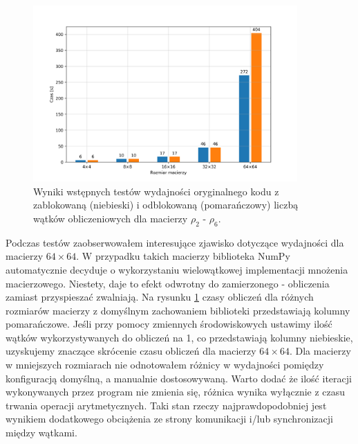 \documentclass[10pt, a4paper]{article}
\begin{document}
\begin{sloppypar}
    \FloatBarrier
    \begin{figure}[h]
      \centering
      \includegraphics[width=0.9\textwidth]{"resources/benchmark_1/plot.png"}
      \caption{Wyniki wstępnych testów wydajności oryginalnego kodu z zablokowaną (niebieski) i odblokowaną (pomarańczowy) liczbą wątków obliczeniowych dla macierzy $\rho
      _{2}$ - $\rho_{6}$.}
      \label{pre-perf}
    \end{figure}
    \FloatBarrier

    Podczas testów zaobserwowałem interesujące zjawisko dotyczące wydajności dla macierzy
    $64\times64$. W przypadku takich macierzy biblioteka NumPy automatycznie decyduje o
    wykorzystaniu wielowątkowej implementacji mnożenia macierzowego. Niestety, daje to
    efekt odwrotny do zamierzonego - obliczenia zamiast przyspieszać zwalniają. Na rysunku
    \ref{pre-perf} czasy obliczeń dla różnych rozmiarów macierzy z domyślnym zachowaniem
    biblioteki przedstawiają kolumny pomarańczowe. Jeśli przy pomocy zmiennych
    środowiskowych ustawimy ilość wątków wykorzystywanych do obliczeń na 1, co przedstawiają
    kolumny niebieskie, uzyskujemy znaczące skrócenie czasu obliczeń dla macierzy
    $64\times64$. Dla macierzy w mniejszych rozmiarach nie odnotowałem różnicy w wydajności
    pomiędzy konfiguracją domyślną, a manualnie dostosowywaną. Warto dodać że ilość iteracji
    wykonywanych przez program nie zmienia się, różnica wynika wyłącznie z czasu trwania
    operacji arytmetycznych. Taki stan rzeczy najprawdopodobniej jest wynikiem dodatkowego
    obciążenia ze strony komunikacji i/lub synchronizacji między wątkami.



\end{sloppypar}
\end{document}
